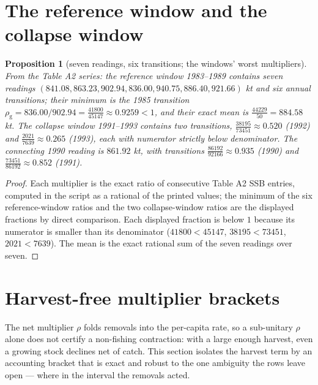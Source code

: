 \documentclass[10pt,twocolumn]{article}
\theoremstyle{plain}
\newtheorem{proposition}[theorem]{Proposition}
\theoremstyle{remark}
\begin{document}
\section{The reference window and the collapse window}\label{windows}

\begin{proposition}[seven readings, six transitions; the windows'
worst multipliers]
\label{prop:windows}
From the Table A2 series: the reference window 1983--1989 contains
seven readings \((841.08, 863.23, 902.94, 836.00, 940.75, 886.40,
921.66)\) kt and six annual transitions; their minimum is the 1985
transition \(\rho_{\mathrm{g}} = 836.00/902.94 =
\tfrac{41800}{45147} \approx 0.9259 < 1\), and their exact mean is
\(\tfrac{44229}{50} = 884.58\) kt. The collapse window 1991--1993
contains two transitions,
\(\tfrac{38195}{73451} \approx 0.520\) (1992) and
\(\tfrac{2021}{7639} \approx 0.265\) (1993), each with numerator
strictly below denominator. The connecting 1990 reading is
\(861.92\) kt, with transitions
\(\tfrac{86192}{92166} \approx 0.935\) (1990) and
\(\tfrac{73451}{86192} \approx 0.852\) (1991).
\end{proposition}

\begin{proof}
Each multiplier is the exact ratio of consecutive Table A2 SSB entries,
computed in the script as a rational of the printed values; the
minimum of the six reference-window ratios and the two collapse-window
ratios are the displayed fractions by direct comparison. Each
displayed fraction is below \(1\) because its numerator is smaller
than its denominator (\(41800 < 45147\), \(38195 < 73451\),
\(2021 < 7639\)). The mean is the exact rational sum of the seven
readings over seven.
\end{proof}

\section{Harvest-free multiplier brackets}\label{brackets}

The net multiplier \(\rho\) folds removals into the per-capita rate,
so a sub-unitary \(\rho\) alone does not certify a non-fishing
contraction: with a large enough harvest, even a growing stock
declines net of catch. This section isolates the harvest term by an
accounting bracket that is exact and robust to the one ambiguity the
rows leave open --- where in the interval the removals acted.
\end{document}
